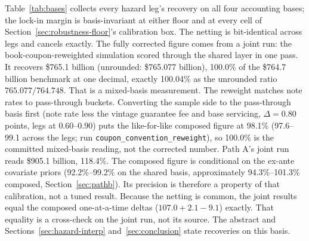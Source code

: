 \documentclass[12pt]{article}
\begin{document}
Table~\ref{tab:bases} collects every hazard leg's recovery on all four accounting bases; the lock-in margin is basis-invariant at either floor and at every cell of Section~\ref{sec:robustness-floor}'s calibration box. The netting is bit-identical across legs and cancels exactly. The fully corrected figure comes from a joint run: the book-coupon-reweighted simulation scored through the shared layer in one pass. It recovers \$765.1 billion (unrounded: \$765.077 billion), 100.0\% of the \$764.7 billion benchmark at one decimal, exactly 100.04\% as the unrounded ratio $765.077/764.748$. That is a mixed-basis measurement. The reweight matches note rates to pass-through buckets. Converting the sample side to the pass-through basis first (note rate less the vintage guarantee fee and base servicing, $\Delta = 0.80$ points, legs at $0.60$--$0.90$) puts the like-for-like composed figure at 98.1\% (97.6--99.1 across the legs; run \texttt{coupon\_convention\_reweight}), so 100.0\% is the committed mixed-basis reading, not the corrected number. Path A's joint run reads \$905.1 billion, 118.4\%. The composed figure is conditional on the ex-ante covariate priors (92.2\%--99.2\% on the shared basis, approximately 94.3\%--101.3\% composed, Section~\ref{sec:pathb}). Its precision is therefore a property of that calibration, not a tuned result. Because the netting is common, the joint results equal the composed one-at-a-time deltas ($107.0 + 2.1 - 9.1$) exactly. That equality is a cross-check on the joint run, not its source. The abstract and Sections~\ref{sec:hazard-interp} and~\ref{sec:conclusion} state recoveries on this basis.
\end{document}
